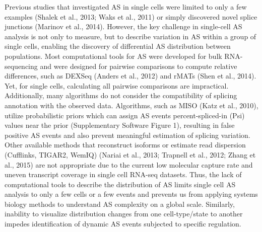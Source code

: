 Previous studies that investigated AS in single cells were limited to only a few examples (Shalek et al., 2013; Waks et al., 2011) or simply discovered novel splice junctions (Marinov et al., 2014). However, the key challenge in single-cell AS analysis is not only to measure, but to describe variation in AS within a group of single cells, enabling the discovery of differential AS distribution between populations. Most computational tools for AS were developed for bulk RNA-sequencing and were designed for pairwise comparisons to compute relative differences, such as DEXSeq (Anders et al., 2012) and rMATs (Shen et al., 2014). Yet, for single cells, calculating all pairwise comparisons are impractical. Additionally, many algorithms do not consider the compatibility of splicing annotation with the observed data. Algorithms, such as MISO (Katz et al., 2010), utilize probabilistic priors which can assign AS events percent-spliced-in (Psi) values near the prior (Supplementary Software Figure 1), resulting in false positive AS events and also prevent meaningful estimation of splicing variation. Other available methods that reconstruct isoforms or estimate read dispersion (Cufflinks, TIGAR2, WemIQ) (Nariai et al., 2013; Trapnell et al., 2012; Zhang et al., 2015) are not appropriate due to the current low molecular capture rate and uneven transcript coverage in single cell RNA-seq datasets. Thus, the lack of computational tools to describe the distribution of AS limits single cell AS analysis to only a few cells or a few events and prevents us from applying systems biology methods to understand AS complexity on a global scale. Similarly, inability to visualize distribution changes from one cell-type/state to another impedes identification of dynamic AS events subjected to specific regulation.
